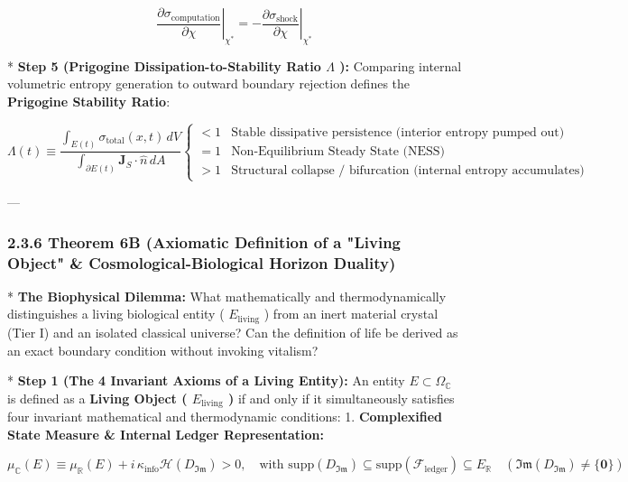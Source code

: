 \documentclass[11pt,a4paper]{article}
\theoremstyle{definition}
\theoremstyle{remark}
\begin{document}
\begin{equation}
\boxed{\left. \frac{\partial \sigma_{\text{computation}}}{\partial \chi} \right|_{\chi^*} = -\left. \frac{\partial \sigma_{\text{shock}}}{\partial \chi} \right|_{\chi^*}}
\end{equation}


* \textbf{Step 5 (Prigogine Dissipation-to-Stability Ratio $\Lambda$ ):}
Comparing internal volumetric entropy generation to outward boundary rejection defines the \textbf{Prigogine Stability Ratio}:


\begin{equation}
\boxed{\Lambda(t) \equiv \frac{\int_{E(t)} \sigma_{\text{total}}(x, t) \, dV}{\int_{\partial E(t)} \mathbf{J}_S \cdot \hat{n} \, dA} \begin{cases} < 1 & \text{Stable dissipative persistence (interior entropy pumped out)} \\ = 1 & \text{Non-Equilibrium Steady State (NESS)} \\ > 1 & \text{Structural collapse / bifurcation (internal entropy accumulates)} \end{cases}}
\end{equation}


---

\subsubsection{2.3.6 Theorem 6B (Axiomatic Definition of a "Living Object" \& Cosmological-Biological Horizon Duality)}
* \textbf{The Biophysical Dilemma:} What mathematically and thermodynamically distinguishes a living biological entity ( $E_{\text{living}}$ ) from an inert material crystal (Tier I) and an isolated classical universe? Can the definition of life be derived as an exact boundary condition without invoking vitalism?

* \textbf{Step 1 (The 4 Invariant Axioms of a Living Entity):}
An entity $E \subset \Omega_{\mathbb{C}}$ is defined as a \textbf{Living Object ( $E_{\text{living}}$ )} if and only if it simultaneously satisfies four invariant mathematical and thermodynamic conditions:
1. \textbf{Complexified State Measure \& Internal Ledger Representation:}


\begin{equation}
\boxed{\mu_{\mathbb{C}}(E) \equiv \mu_{\mathbb{R}}(E) + i \, \kappa_{\text{info}} \mathcal{H}(D_{\mathfrak{Im}}) > 0, \quad \text{with } \mathrm{supp}(D_{\mathfrak{Im}}) \subseteq \mathrm{supp}(\mathcal{F}_{\text{ledger}}) \subseteq E_{\mathbb{R}} \quad (\mathfrak{Im}(D_{\mathfrak{Im}}) \neq \{\mathbf{0}\})}
\end{equation}
\end{document}
